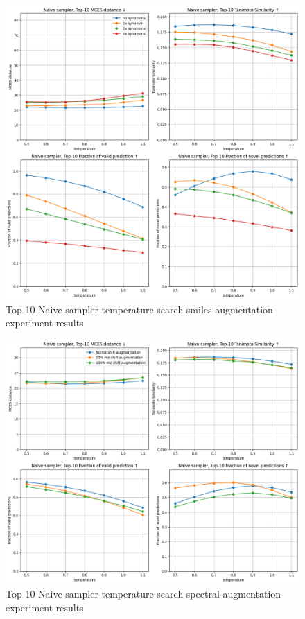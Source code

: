 \begin{figure}[H]
    \centering
    \includegraphics[width=1.0\textwidth]{figures/appendix/smiles_augmentation_with_tanimoto.png}
    \caption{Top-10 Naive sampler temperature search smiles augmentation experiment results}
    \label{fig:smiles_augmentation_appendix}
\end{figure}

\begin{figure}[H]
    \centering
    \includegraphics[width=1.0\textwidth]{figures/appendix/spectal_augmentation_with_tanimoto.png}
    \caption{Top-10 Naive sampler temperature search spectral augmentation experiment results}
    \label{fig:spectral_augmentation_appendix}
\end{figure}

